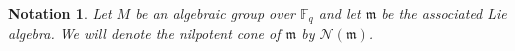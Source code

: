 \documentclass{amsart}
\theoremstyle{plain}
\newtheorem{proposition}{Proposition}[section]
\newtheorem{notation}{Notation}[section]
\theoremstyle{definition}
\theoremstyle{remark}
\DeclareMathOperator{\rk}{rk}
\begin{document}
\begin{notation}
Let $M$ be an algebraic group over $\mathbb{F}_{q}$ and let $\mathfrak{m}$ be the associated Lie algebra. We will denote the nilpotent cone of $\mathfrak{m}$ by $\mathcal{N}(\mathfrak{m})$. 
\end{notation}
\end{document}
